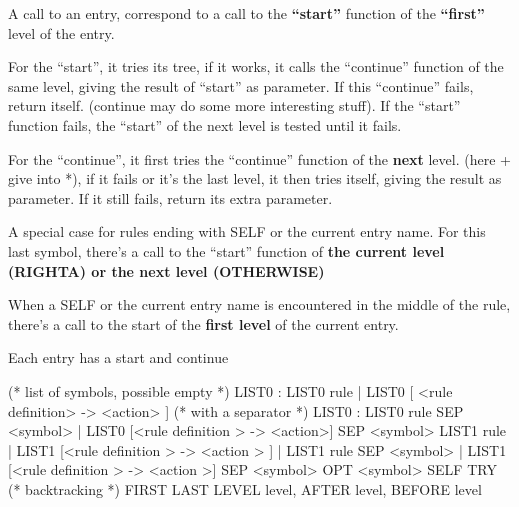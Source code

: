 \begin{enumerate}[(a)]
  A call to an entry, correspond to a call to the \textbf{``start''} function of
  the \textbf{``first''} level of the entry.

  For the ``start'', it tries its tree, if it works, it calls the
  ``continue'' function of the same level, giving the result of ``start''
  as parameter. If this ``continue'' fails, return itself. (continue may
  do some more interesting stuff). If the ``start'' function fails, the
  ``start'' of the next level is tested until it fails. 


  For the ``continue'', it first tries the ``continue'' function of the
  \textbf{next} level. (here + give into *), if it fails or it's the
  last level, it then tries itself, giving the result as parameter. If
  it still fails, return its extra parameter.

  A special case for rules ending with SELF or the current entry
  name. For this last symbol, there's a call to the ``start'' function
  of \textbf{the current level (RIGHTA) or the next level (OTHERWISE)}

  When a SELF or the current entry name is encountered in the middle
  of the rule, there's a call to the start of the \textbf{first level} of the
  current entry.

  Each entry has a start and continue

\begin{bluecode}
(* list of symbols, possible empty *)
LIST0 : LIST0 rule | LIST0 [ <rule definition> -> <action> ]
(* with a separator *)
LIST0 : LIST0 rule SEP <symbol>
| LIST0 [<rule definition > -> <action>] SEP <symbol>
  LIST1 rule
| LIST1 [<rule definition > -> <action > ]
| LIST1 rule SEP <symbol>
| LIST1 [<rule definition > -> <action >] SEP <symbol>
OPT <symbol>
SELF
TRY (* backtracking *)
FIRST LAST LEVEL level, AFTER level, BEFORE level 
\end{bluecode}

\end{enumerate}


